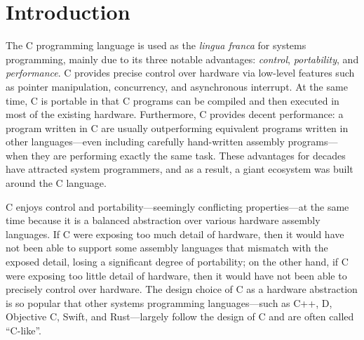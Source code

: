 \section{Introduction}
\label{sec:introduction}

The C programming language is used as the \emph{lingua franca} for systems programming, mainly due
to its three notable advantages: \emph{control}, \emph{portability}, and \emph{performance}.  C
provides precise control over hardware via low-level features such as pointer manipulation,
concurrency, and asynchronous interrupt.  At the same time, C is portable in that C programs can be
compiled and then executed in most of the existing hardware.  Furthermore, C provides decent
performance: a program written in C are usually outperforming equivalent programs written in other
languages---even including carefully hand-written assembly programs---when they are performing
exactly the same task.  These advantages for decades have attracted system programmers, and as a
result, a giant ecosystem was built around the C language.

C enjoys control and portability---seemingly conflicting properties---at the same time because it is
a balanced abstraction over various hardware assembly languages.  If C were exposing too much detail
of hardware, then it would have not been able to support some assembly languages that mismatch with
the exposed detail, losing a significant degree of portability; on the other hand, if C were
exposing too little detail of hardware, then it would have not been able to precisely control over
hardware.  The design choice of C as a hardware abstraction is so popular that other systems
programming languages---such as C++, D, Objective C, Swift, and Rust---largely follow the design of
C and are often called ``C-like''.





